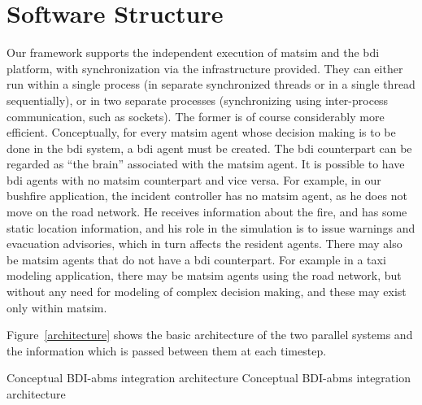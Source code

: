 \section{Software Structure}
\label{sec:bdi-structure}
Our framework supports the independent execution of \gls{matsim} and the \gls{bdi} platform, with 
synchronization via the infrastructure provided.
They can either run within a single process (in
separate synchronized threads or in a single thread sequentially), or in two
separate processes (synchronizing using inter-process communication, such as
sockets). The former is of course considerably more efficient. 
%
Conceptually, for every \gls{matsim} agent whose decision making is to be
done in the \gls{bdi} system, a \gls{bdi} agent must be created. The \gls{bdi} counterpart can
be regarded as ``the brain'' associated with the \gls{matsim} agent. It is
possible to have \gls{bdi} agents with no \gls{matsim} counterpart and vice
versa. For example, in our bushfire application, the incident
controller has no \gls{matsim} agent, as he does not move on the road
network. He receives information about the fire, and has some static
location information, and his role in the simulation is to issue
warnings and evacuation advisories, which in turn affects the resident
agents. There may also be \gls{matsim} agents that do not have a \gls{bdi}
counterpart. For example in a taxi modeling application, there may be
\gls{matsim} agents using the road network, but without any need for
modeling of complex decision making, and these may exist only within
\gls{matsim}. 

Figure~\ref{architecture} shows the basic architecture of the
two parallel systems and the information which is passed between them
at each timestep.

%

\createfigure%
{Conceptual BDI-\gls{abms} integration architecture}%
{Conceptual BDI-\gls{abms} integration architecture}%
{\label{architecture}}%
{\resizebox{0.75\textwidth}{!}{}}%
{}

